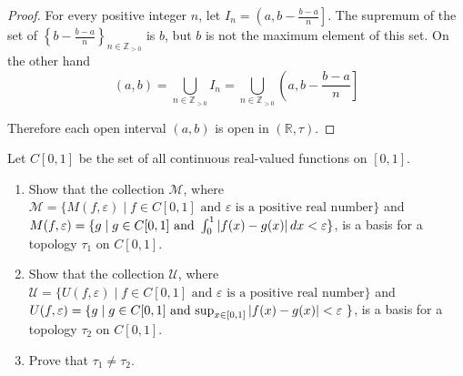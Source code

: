 \begin{proof}
	For every positive integer $n$, let $I_{n} = \left( a, b - \frac{b-a}{n} \right]$. The supremum of the set of ${\left\{b - \frac{b-a}{n}\right\}}_{n\in\mathbb{Z}_{>0}}$ is $b$, but $b$ is not the maximum element of this set. On the other hand
	\[
		(a, b) = \bigcup_{n\in\mathbb{Z}_{>0}} I_{n} = \bigcup_{n\in\mathbb{Z}_{>0}} \left( a, b - \frac{b-a}{n} \right]
	\]

	Therefore each open interval $(a, b)$ is open in $(\mathbb{R}, \tau)$.
\end{proof}
\newpage

\begin{exercise}
	Let $C[0, 1]$ be the set of all continuous real-valued functions on $[0, 1]$.
	\begin{enumerate}[label={(\roman*)}]
		\item Show that the collection $\mathcal{M}$, where $\mathcal{M} = \{ M(f, \varepsilon) \mid f\in C[0, 1] \text{ and $\varepsilon$ is a positive real number} \}$ and $M(f, \varepsilon) = \{ g \mid g\in C[0, 1] \text{ and } \int^{1}_{0} \left\vert{f(x) - g(x)}\right\vert dx < \varepsilon \}$, is a basis for a topology $\tau_{1}$ on $C[0, 1]$.
		\item Show that the collection $\mathcal{U}$, where $\mathcal{U} = \{ U(f, \varepsilon) \mid  f\in C[0, 1] \text{ and $\varepsilon$ is a positive real number} \}$ and $U(f, \varepsilon) = \{ g \mid g\in C[0, 1] \text{ and $\sup_{x\in [0,1]}\left\vert{f(x) - g(x)}\right\vert < \varepsilon$ } \}$, is a basis for a topology $\tau_{2}$ on $C[0, 1]$.
		\item Prove that $\tau_{1}\ne \tau_{2}$.
	\end{enumerate}
\end{exercise}

